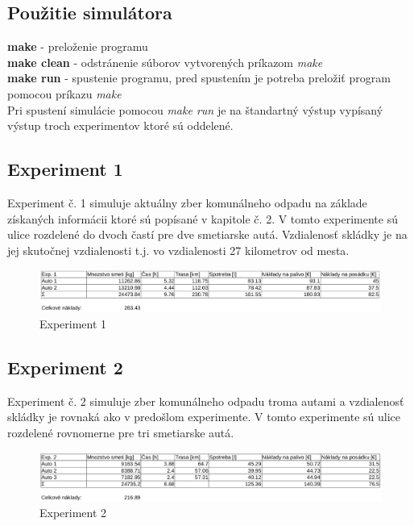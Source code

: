\documentclass[11pt,a4paper]{article}
\begin{document}
    \subsection{Použitie simulátora}

        \noindent \textbf{make} - preloženie programu\\[0.4em]
        \noindent \textbf{make clean} - odstránenie súborov vytvorených príkazom \textit{make}\\[0.4em]
        \noindent \textbf{make run} - spustenie programu, pred spustením je potreba preložiť program pomocou príkazu \textit{make}\\

        \noindent Pri spustení simulácie pomocou \textit{make run} je na štandartný výstup vypísaný výstup troch experimentov ktoré sú oddelené.

    \subsection{Experiment 1}

        Experiment č. 1 simuluje aktuálny zber komunálneho odpadu na základe získaných informácii ktoré sú popísané v kapitole č. 2. V tomto experimente sú ulice rozdelené do dvoch častí pre dve smetiarske autá. Vzdialenosť skládky je na jej skutočnej vzdialenosti t.j. vo vzdialenosti 27 kilometrov od mesta.

\begin{figure}[h]
    \center
    \includegraphics[scale=0.3]{img/exp1.eps}
    \caption{Experiment 1}
    \label{E1}
\end{figure}

    \subsection{Experiment 2}

        Experiment č. 2 simuluje zber komunálneho odpadu troma autami a vzdialenosť skládky je rovnaká ako v predošlom experimente. V tomto experimente sú ulice rozdelené rovnomerne pre tri smetiarske autá.

\begin{figure}[h]
    \center
    \includegraphics[scale=0.3]{img/exp2.eps}
    \caption{Experiment 2}
    \label{E2}
\end{figure}
\end{document}

